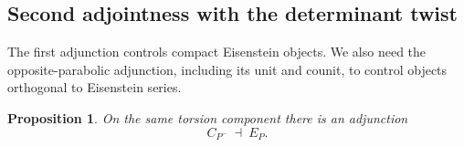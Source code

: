 \documentclass[11pt]{article}
\numberwithin{equation}{section}
\newtheorem{proposition}[theorem]{Proposition}
\theoremstyle{definition}
\theoremstyle{remark}
\begin{document}
\subsection{Second adjointness with the determinant twist}

The first adjunction controls compact Eisenstein objects.  We also need the
opposite-parabolic adjunction, including its unit and counit, to control
objects orthogonal to Eisenstein series.

\begin{proposition}\label{pseudo:second-adjunction}
On the same torsion component there is an adjunction
\begin{equation}\label{eq:M3}
 C_{P^-}\ \dashv\ E_P.
\end{equation}
\end{proposition}
\end{document}

